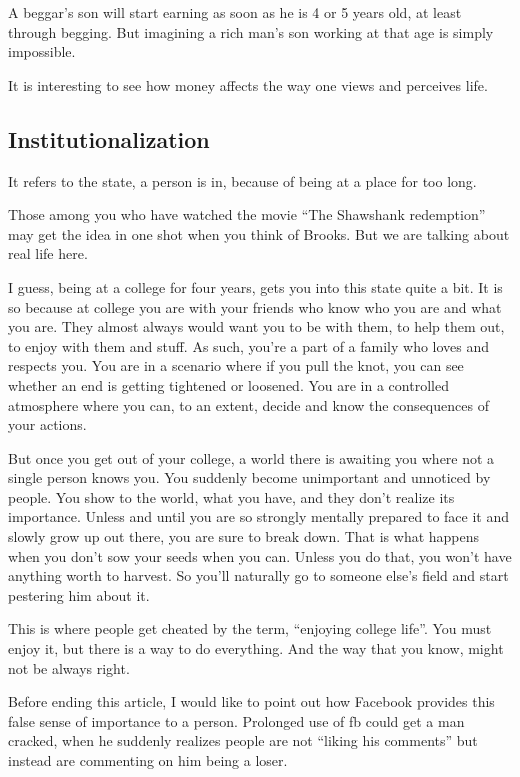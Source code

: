 \documentclass[twoside,11pt,titlepage]{article}
\begin{document}
A beggar's son will start earning as soon as he is 4 or 5 years old, at least through begging. But imagining a rich man's son working at that age is simply impossible.

It is interesting to see how money affects the way one views and perceives life.

\newpage
\begin{center}
  \section{Institutionalization}
\end{center}
\bigskip
\bigskip
\bigskip

It refers to the state, a person is in, because of being at a place for too long.

Those among you who have watched the movie ``The Shawshank redemption'' may get the idea in one shot when you think of Brooks. But we are talking about real life here.

I guess, being at a college for four years, gets you into this state quite a bit. It is so because at college you are with your friends who know who you are and what you are. They almost always would want you to be with them, to help them out, to enjoy with them and stuff. As such, you're a part of a family who loves and respects you. You are in a scenario where if you pull the knot, you can see whether an end is getting tightened or loosened. You are in a controlled atmosphere where you can, to an extent, decide and know the consequences of your actions.

But once you get out of your college, a world there is awaiting you where not a single person knows you. You suddenly become unimportant and unnoticed by people. You show to the world, what you have, and they don't realize its importance. Unless and until you are so strongly mentally prepared to face it and slowly grow up out there, you are sure to break down. That is what happens when you don't sow your seeds when you can. Unless you do that, you won't have anything worth to harvest. So you'll naturally go to someone else's field and start pestering him about it.

This is where people get cheated by the term, ``enjoying college life''. You must enjoy it, but there is a way to do everything. And the way that you know, might not be always right.

Before ending this article, I would like to point out how Facebook provides this false sense of importance to a person. Prolonged use of fb could get a man cracked, when he suddenly realizes people are not ``liking his comments'' but instead are commenting on him being a loser.
\end{document}
